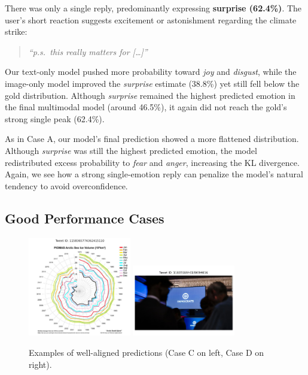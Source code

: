 There was only a single reply, predominantly expressing \textbf{surprise (62.4\%)}. The user’s short reaction suggests excitement or astonishment regarding the climate strike:
\begin{quote}
\emph{``p.s.\ this really matters for [\dots]''}
\end{quote}

Our text-only model pushed more probability toward \textit{joy} and \textit{disgust}, while the image-only model improved the \textit{surprise} estimate (38.8\%) yet still fell below the gold distribution. Although \textit{surprise} remained the highest predicted emotion in the final multimodal model (around 46.5\%), it again did not reach the gold’s strong single peak (62.4\%). 
\newline

As in Case A, our model’s final prediction showed a more flattened distribution. Although \textit{surprise} was still the highest predicted emotion, the model redistributed excess probability to \textit{fear} and \textit{anger}, increasing the KL divergence. Again, we see how a strong single-emotion reply can penalize the model’s natural tendency to avoid overconfidence.

\subsection*{Good Performance Cases}

\begin{figure}[h]
    \centering
    \includegraphics[width=0.4\textwidth]{images/good1.png} 
    \hfill
    \includegraphics[width=0.4\textwidth]{images/good2.png}
    \caption{Examples of well-aligned predictions (Case C on left, Case D on right).}
    \label{fig:good_cases}
\end{figure}

